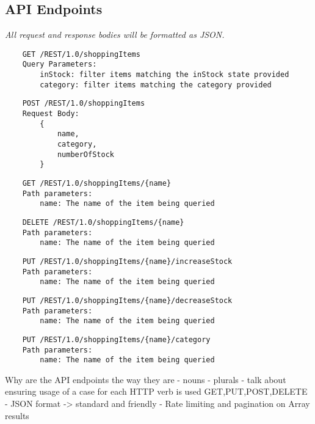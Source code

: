 \subsection{API Endpoints}

\it{All request and response bodies will be formatted as JSON.}

\begin{verbatim}
    GET /REST/1.0/shoppingItems
    Query Parameters:
        inStock: filter items matching the inStock state provided
        category: filter items matching the category provided
\end{verbatim}

\begin{verbatim}
    POST /REST/1.0/shoppingItems
    Request Body:
        {
            name,
            category,
            numberOfStock
        }
\end{verbatim}

\begin{verbatim}
    GET /REST/1.0/shoppingItems/{name}
    Path parameters:
        name: The name of the item being queried
\end{verbatim}

\begin{verbatim}
    DELETE /REST/1.0/shoppingItems/{name}
    Path parameters:
        name: The name of the item being queried
\end{verbatim}

\begin{verbatim}
    PUT /REST/1.0/shoppingItems/{name}/increaseStock
    Path parameters:
        name: The name of the item being queried
\end{verbatim}


\begin{verbatim}
    PUT /REST/1.0/shoppingItems/{name}/decreaseStock
    Path parameters:
        name: The name of the item being queried
\end{verbatim}


\begin{verbatim}
    PUT /REST/1.0/shoppingItems/{name}/category
    Path parameters:
        name: The name of the item being queried
\end{verbatim}

Why are the API endpoints the way they are
- nouns
- plurals
- talk about ensuring usage of a case for each HTTP verb is used GET,PUT,POST,DELETE
- JSON format -> standard and friendly
- Rate limiting and pagination on Array results



